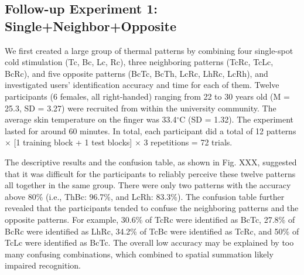 \documentclass[preprint,12pt]{elsarticle}
\begin{document}
\subsection{Follow-up Experiment 1: Single+Neighbor+Opposite}
We first created a large group of thermal patterns by combining four single-spot cold stimulation (Tc, Bc, Lc, Rc), three neighboring patterns (TcRc, TcLc, BcRc), and five opposite patterns (BcTc, BcTh, LcRc, LhRc, LcRh), and investigated users' identification accuracy and time for each of them. Twelve participants (6 females, all right-handed) ranging from 22 to 30 years old (M = 25.3, SD = 3.27) were recruited from within the university community. The average skin temperature on the finger was 33.4$^{\circ}$C (SD = 1.32). The experiment lasted for around 60 minutes. In total, each participant did a total of 12 patterns $\times$ [1 training block + 1 test blocks] $\times$ 3 repetitions = 72 trials.

The descriptive results and the confusion table, as shown in Fig. XXX, suggested that it was difficult for the participants to reliably perceive these twelve patterns all together in the same group. There were only two patterns with the accuracy above 80\% (i.e., ThBc: 96.7\%, and LcRh: 83.3\%). The confusion table further revealed that the participants tended to confuse the neighboring patterns and the opposite patterns. For example, 30.6\% of TcRc were identified as BcTc, 27.8\% of BcRc were identified as LhRc, 34.2\% of TcBc were identified as TcRc, and 50\% of TcLc were identified as BcTc.
The overall low accuracy may be explained by too many confusing combinations, which combined to spatial summation likely impaired recognition.

\end{document}
